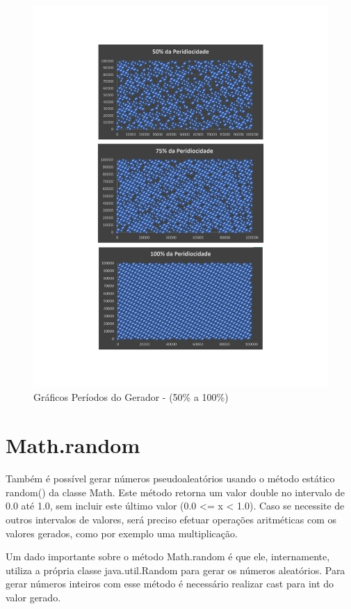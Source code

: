 \begin{figure}[ht]
    \includegraphics[scale=0.74]{JoseGeraldo-lista2/fig/fig4.pdf}
    \caption{Gráficos Períodos do Gerador - (50\% a 100\%)}

\end{figure}

\newpage
\section{Math.random}
Também é possível gerar números pseudoaleatórios usando o método estático random() da classe Math. Este método retorna um valor double no intervalo de 0.0 até 1.0, sem incluir este último valor (0.0 <= x < 1.0). Caso se necessite de outros intervalos de valores, será preciso efetuar operações aritméticas com os valores gerados, como por exemplo uma multiplicação\cite{site2}.

Um dado importante sobre o método Math.random é que ele, internamente, utiliza a própria classe java.util.Random para gerar os números aleatórios.
Para gerar números inteiros com esse método é necessário realizar cast para int do valor gerado\cite{site2}.

